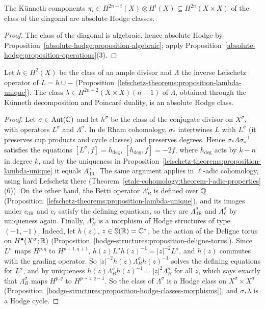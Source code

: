 \begin{corollary}\label{absolute-hodge:corollary-kunneth}
The K\"unneth components $\pi_i \in H^{2n-i}(X) \otimes H^i(X) \subseteq H^{2n}(X \times X)$ of the class of the diagonal are absolute Hodge classes.
\end{corollary}

\begin{proof}
The class of the diagonal is algebraic, hence absolute Hodge by Proposition~\ref{absolute-hodge:proposition-algebraic}; apply Proposition~\ref{absolute-hodge:proposition-operations}(3).
\end{proof}

\begin{corollary}\label{absolute-hodge:corollary-lambda}
Let $h \in H^2(X)$ be the class of an ample divisor and $\Lambda$ the inverse Lefschetz operator of $L = h \cup -$ (Proposition~\ref{lefschetz-theorems:proposition-lambda-unique}). The class
$\lambda \in H^{2n-2}(X \times X)(n-1)$ of $\Lambda$, obtained through the K\"unneth decomposition and Poincar\'e duality, is an absolute Hodge class.
\end{corollary}

\begin{proof}
Let $\sigma \in \mathrm{Aut}(\mathbb{C})$ and let $h^\sigma$ be the class of the conjugate divisor on $X^\sigma$, with operators $L^\sigma$ and $\Lambda^\sigma$. In de Rham cohomology, $\sigma_*$ intertwines $L$ with $L^\sigma$ (it
preserves cup products and cycle classes) and preserves degrees. Hence $\sigma_*\Lambda\sigma_*^{-1}$ satisfies the equations $[L^\sigma, f] = h_{\deg}$, $[h_{\deg}, f] = -2f$, where $h_{\deg}$ acts by $k - n$ in degree $k$,
and by the uniqueness in Proposition~\ref{lefschetz-theorems:proposition-lambda-unique} it equals $\Lambda^\sigma_{\mathrm{dR}}$. The same argument applies in $\ell$-adic cohomology, using hard Lefschetz there
(Theorem~\ref{etale-cohomology:theorem-l-adic-properties}(6)). On the other hand, the Betti operator $\Lambda^\sigma_B$ is defined over $\mathbb{Q}$ (Proposition~\ref{lefschetz-theorems:proposition-lambda-unique}),
and its images under $c_{\mathrm{dR}}$ and $c_\ell$ satisfy the defining equations, so they are $\Lambda^\sigma_{\mathrm{dR}}$ and $\Lambda^\sigma_\ell$ by uniqueness again. Finally, $\Lambda^\sigma_B$ is a morphism of Hodge
structures of type $(-1,-1)$. Indeed, let $h(z)$, $z \in \mathbb{S}(\mathbb{R}) = \mathbb{C}^*$, be the action of the Deligne torus on $H^\bullet(X^\sigma; \mathbb{R})$ (Proposition~\ref{hodge-structures:proposition-deligne-torus}). Since
$L^\sigma$ maps $H^{p,q}$ to $H^{p+1,q+1}$, $h(z)L^\sigma h(z)^{-1} = |z|^{-2}L^\sigma$, and $h(z)$ commutes with the grading operator. So $|z|^{-2}h(z)\Lambda^\sigma_Bh(z)^{-1}$ solves the defining equations for
$L^\sigma$, and by uniqueness $h(z)\Lambda^\sigma_Bh(z)^{-1} = |z|^2\Lambda^\sigma_B$ for all $z$, which says exactly that $\Lambda^\sigma_B$ maps $H^{p,q}$ to $H^{p-1,q-1}$. So the class of $\Lambda^\sigma$ is a Hodge class on $X^\sigma \times X^\sigma$
(Proposition~\ref{hodge-structures:proposition-hodge-classes-morphisms}), and $\sigma_*\lambda$ is a Hodge cycle.
\end{proof}

